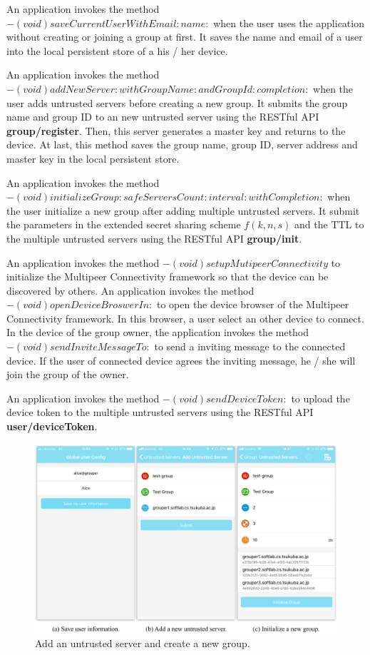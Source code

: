 \documentclass[a4paper,11pt]{report}
\begin{document}
An application invokes the method $- (void)saveCurrentUserWithEmail:name:$ when the user uses the application without creating or joining a group at first.
It saves the name and email of a user into the local persistent store of a his / her device.

An application invokes the method $- (void)addNewServer:withGroupName:andGroupId:completion:$ when the user adds untrusted servers before creating a new group. 
It submits the group name and group ID to an new untrusted server using the RESTful API \textbf{group/register}.
Then, this server generates a master key and returns to the device.
At last, this method saves the group name, group ID, server address and master key in the local persistent store.

An application invokes the method $- (void)initializeGroup:safeServersCount:interval:withCompletion:$  when the user initialize a new group after adding multiple untrusted servers.
It submit the parameters in the extended secret sharing scheme $f(k, n, s)$ and the TTL to the multiple untrusted servers using the RESTful API \textbf{group/init}.

An application invokes the method $- (void)setupMutipeerConnectivity$ to initialize the Multipeer Connectivity framework so that the device can be discovered by others.
An application invokes the method $- (void)openDeviceBroswerIn:$ to open the device browser of the Multipeer Connectivity framework.
In this browser, a user select an other device to connect.
In the device of the group owner, the application invokes the method $- (void)sendInviteMessageTo:$ to send a inviting message to the connected device.
If the user of connected device agrees the inviting message, he / she will join the group of the owner.

An application invokes the method $- (void)sendDeviceToken:$ to upload the device token to the multiple untrusted servers using the RESTful API \textbf{user/deviceToken}.

\begin{figure}[t]
	\centering
	\includegraphics[scale=0.58]{group_manager_screenshot}
	\caption{Add an untrusted server and create a new group.}
	\label{fig:group_manager_screenshot}
\end{figure}
\end{document}
